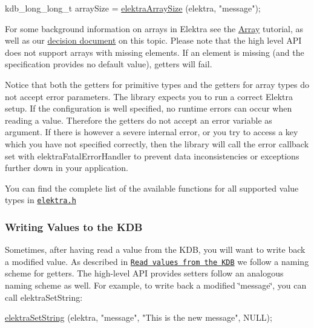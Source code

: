 \begin{DoxyCode}
kdb\_long\_long\_t arraySize = \hyperlink{group__highlevel_gaf0413286c6faebdc951b739924111909}{elektraArraySize} (elektra, \textcolor{stringliteral}{"message"});
\end{DoxyCode}


For some background information on arrays in Elektra see the \hyperlink{doc_tutorials_arrays_md}{Array} tutorial, as well as our \hyperlink{doc_decisions_array_md}{decision document} on this topic. Please note that the high level A\+PI does not support arrays with missing elements. If an element is missing (and the specification provides no default value), getters will fail.

Notice that both the getters for primitive types and the getters for array types do not accept error parameters. The library expects you to run a correct Elektra setup. If the configuration is well specified, no runtime errors can occur when reading a value. Therefore the getters do not accept an error variable as argument. If there is however a severe internal error, or you try to access a key which you have not specified correctly, then the library will call the error callback set with {\ttfamily elektra\+Fatal\+Error\+Handler} to prevent data inconsistencies or exceptions further down in your application.

You can find the complete list of the available functions for all supported value types in \href{/home/markus/Projekte/Elektra/current/src/include/elektra.h}{\tt elektra.\+h}

\subsubsection*{Writing Values to the K\+DB}

Sometimes, after having read a value from the K\+DB, you will want to write back a modified value. As described in \href{#read-values-from-the-kdb}{\tt Read values from the K\+DB} we follow a naming scheme for getters. The high-\/level A\+PI provides setters follow an analogous naming scheme as well. For example, to write back a modified \char`\"{}message\char`\"{}, you can call {\ttfamily elektra\+Set\+String}\+:


\begin{DoxyCode}
\hyperlink{group__highlevel_ga563a695658e8e6f74183cca674edd1a7}{elektraSetString} (elektra, \textcolor{stringliteral}{"message"}, \textcolor{stringliteral}{"This is the new message"}, NULL);
\end{DoxyCode}


